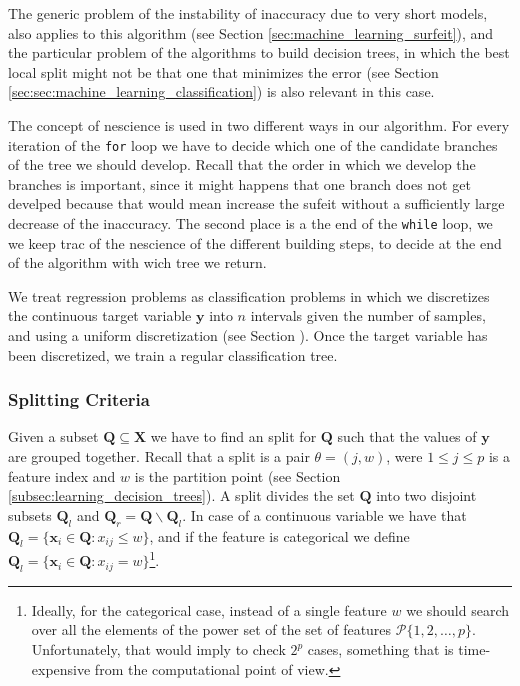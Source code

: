 The generic problem of the instability of inaccuracy due to very short models, also applies to this algorithm (see Section \ref{sec:machine_learning_surfeit}), and the particular problem of the algorithms to build decision trees, in which the best local split might not be that one that minimizes the error (see Section \ref{sec:sec:machine_learning_classification}) is also relevant in this case.

The concept of nescience is used in two different ways in our algorithm. For every iteration of the \texttt{for} loop we have to decide which one of the candidate branches of the tree we should develop. Recall that the order in which we develop the branches is important, since it might happens that one branch does not get develped because that would mean increase the sufeit without a sufficiently large decrease of the inaccuracy. The second place is a the end of the \texttt{while} loop, we we keep trac of the nescience of the different building steps, to decide at the end of the algorithm with wich tree we return.

We treat regression problems as classification problems in which we discretizes the continuous target variable $\mathbf{y}$ into $n$ intervals given the number of samples, and using a uniform discretization (see Section \label{sec:codes_continuous_data}). Once the target variable has been discretized, we train a regular classification tree.

\subsubsection*{Splitting Criteria}
\label{sub:tree_splitting_criteria}

Given a subset $\mathbf{Q} \subseteq \mathbf{X}$ we have to find an split for $\mathbf{Q}$ such that the values of $\textbf{y}$ are grouped together. Recall that a split is a pair $\theta = (j,w)$, were $1 \leq j \leq p$ is a feature index and $w$ is the partition point (see Section \ref{subsec:learning_decision_trees}). A split divides the set $\mathbf{Q}$ into two disjoint subsets $\mathbf{Q}_l$ and $\mathbf{Q}_r = \mathbf{Q} \backslash \mathbf{Q}_l$. In case of a continuous variable we have that $\mathbf{Q}_l = \{\mathbf{x}_i \in \mathbf{Q} : x_{ij} \leq w\}$, and if the feature is categorical we define $\mathbf{Q}_l = \{\mathbf{x}_i \in \mathbf{Q} : x_{ij} = w\}$\footnote{Ideally, for the categorical case, instead of a single feature $w$ we should search over all the elements of the power set of the set of features $\mathcal{P} \{1, 2, \ldots, p \}$. Unfortunately, that would imply to check $2^p$ cases, something that is time-expensive from the computational point of view.}.

